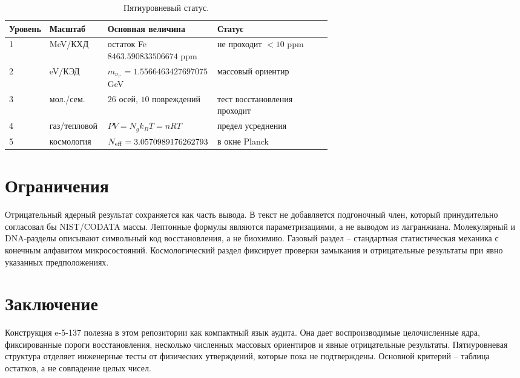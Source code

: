 \documentclass[11pt]{article}
\begin{document}
\begin{table}[h]
\centering
\caption{Пятиуровневый статус.}
\small
\setlength{\tabcolsep}{3pt}
\begin{tabularx}{\linewidth}{@{}P{0.10\linewidth}P{0.18\linewidth}P{0.34\linewidth}Y@{}}
\toprule
Уровень & Масштаб & Основная величина & Статус \\
 & MeV/КХД & остаток Fe $8463.590833506674$ ppm & не проходит $<10$ ppm \\
2 & eV/КЭД & $m_{\nu_{\tau'}}=1.5566463427697075$ GeV & массовый ориентир \\
3 & мол./сем. & $26$ осей, $10$ повреждений & тест восстановления проходит \\
4 & газ/тепловой & $PV=N_gk_BT=nRT$ & предел усреднения \\
5 & космология & $N_{\rm eff}=3.0570989176262793$ & в окне Planck \\
\bottomrule
\end{tabularx}
\end{table}

\section{Ограничения}

Отрицательный ядерный результат сохраняется как часть вывода.  В текст не
добавляется подгоночный член, который принудительно согласовал бы NIST/CODATA
массы.  Лептонные формулы являются параметризациями, а не выводом из
лагранжиана.  Молекулярный и DNA-разделы описывают символьный код
восстановления, а не биохимию.  Газовый раздел -- стандартная статистическая
механика с конечным алфавитом микросостояний.  Космологический раздел
фиксирует проверки замыкания и отрицательные результаты при явно указанных
предположениях.

\section{Заключение}

Конструкция e-5-137 полезна в этом репозитории как компактный язык
аудита.  Она дает воспроизводимые целочисленные ядра, фиксированные пороги
восстановления, несколько численных массовых ориентиров и явные отрицательные
результаты.  Пятиуровневая структура отделяет инженерные тесты от физических
утверждений, которые пока не подтверждены.  Основной критерий -- таблица
остатков, а не совпадение целых чисел.
\end{document}
